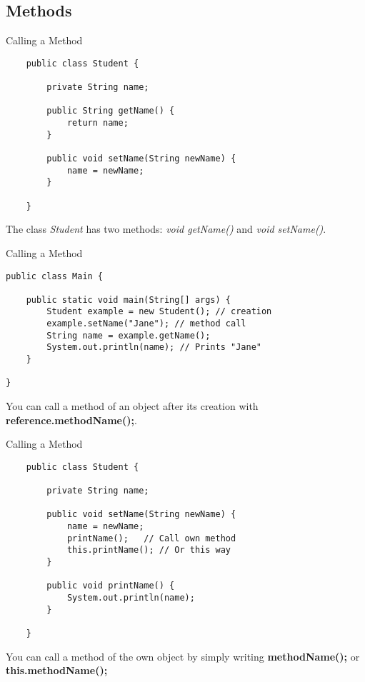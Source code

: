 \subsection{Methods}
\begin{frame}[fragile]{Calling a Method}
    \begin{lstlisting}
    public class Student {
    
        private String name;
    
        public String getName() {
            return name;
        }
        
        public void setName(String newName) {
            name = newName;
        }
       
    } \end{lstlisting}
    The class \emph{Student} has two methods: \emph{void getName()} and \emph{void setName()}.
\end{frame}

\begin{frame}[fragile]{Calling a Method}
\begin{lstlisting}
public class Main {

    public static void main(String[] args) {
        Student example = new Student(); // creation
        example.setName("Jane"); // method call
        String name = example.getName(); 
        System.out.println(name); // Prints "Jane"
    }
    
}\end{lstlisting}
    You can call a method of an object after its creation with \textbf{reference.methodName();}.
\end{frame}

\begin{frame}[fragile]{Calling a Method}
\begin{lstlisting}
    public class Student {
    
        private String name;
    
        public void setName(String newName) {
            name = newName;
            printName();   // Call own method
            this.printName(); // Or this way
        }
        
        public void printName() {
            System.out.println(name);
        }
        
    } \end{lstlisting}
    You can call a method of the own object by simply writing \textbf{methodName();} or \textbf{this.methodName();}
\end{frame}

